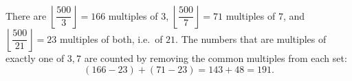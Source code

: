 There are $\left\lfloor\dfrac{500}{3}\right\rfloor=166$ multiples of $3$, $\left\lfloor\dfrac{500}{7}\right\rfloor=71$ multiples of $7$, and $\left\lfloor\dfrac{500}{21}\right\rfloor=23$ multiples of both, i.e.\ of $21$. The numbers that are multiples of exactly one of $3,7$ are counted by removing the common multiples from each set:
\[(166-23)+(71-23)=143+48=\boxed{191}.\]
